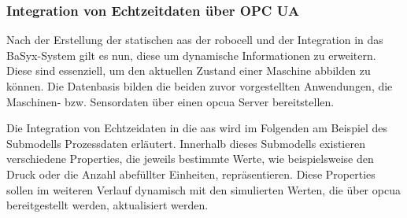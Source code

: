 \subsubsection{Integration von Echtzeitdaten über OPC UA}
Nach der Erstellung der statischen \acs{aas} der robocell und der Integration in das BaSyx-System gilt es nun, diese um dynamische Informationen zu erweitern.
Diese sind essenziell, um den aktuellen Zustand einer Maschine abbilden zu können.
Die Datenbasis bilden die beiden zuvor vorgestellten Anwendungen, die Maschinen- bzw. Sensordaten über einen \acs{opcua} Server bereitstellen.




Die Integration von Echtzeidaten in die \acs{aas} wird im Folgenden am Beispiel des Submodells Prozessdaten erläutert.
Innerhalb dieses Submodells existieren verschiedene Properties, die jeweils bestimmte Werte, wie beispielsweise den Druck oder die Anzahl abefüllter Einheiten, repräsentieren. %
Diese Properties sollen im weiteren Verlauf dynamisch mit den simulierten Werten, die über \acs{opcua} bereitgestellt werden, aktualisiert werden.

